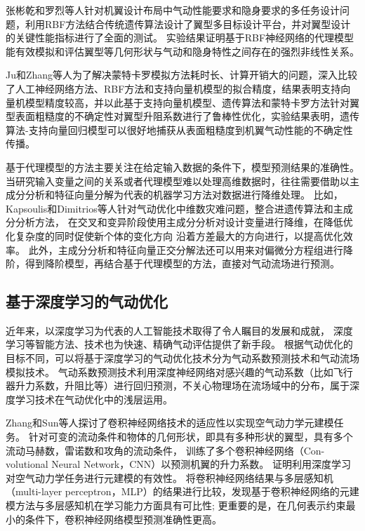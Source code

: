 张彬乾和罗烈等人\cite{张罗}针对机翼设计布局中气动性能要求和隐身要求的多任务设计问题，利用RBF方法结合传统遗传算法设计了翼型多目标设计平台，并对翼型设计的关键性能指标进行了全面的测试。
实验结果证明基于RBF神经网络的代理模型能有效模拟和评估翼型等几何形状与气动和隐身特性之间存在的强烈非线性关系。

Ju和Zhang等人\cite{Ame}为了解决蒙特卡罗模拟方法耗时长、计算开销大的问题，深入比较了人工神经网络方法、RBF方法和支持向量机模型的拟合精度，结果表明支持向量机模型精度较高，并以此基于支持向量机模型、遗传算法和蒙特卡罗方法针对翼型表面粗糙度的不确定性对翼型升阻系数进行了鲁棒性优化，实验结果表明，遗传算法-支持向量回归模型可以很好地捕获从表面粗糙度到机翼气动性能的不确定性传播。

基于代理模型的方法主要关注在给定输入数据的条件下，模型预测结果的准确性。
当研究输入变量之间的关系或者代理模型难以处理高维数据时，往往需要借助以主成分分析和特征向量分解为代表的机器学习方法对数据进行降维处理。
比如，Kapsoulis和Dimitrios等人\cite{Kapsoulis2018Evolutionary}针对气动优化中维数灾难问题，整合进遗传算法和主成分分析方法，
在交叉和变异阶段使用主成分分析对设计变量进行降维，在降低优化复杂度的同时促使新个体的变化方向
沿着方差最大的方向进行，以提高优化效率。
此外，主成分分析和特征向量正交分解法还可以用来对偏微分方程组进行降阶，得到降阶模型，再结合基于代理模型的方法，直接对气动流场进行预测。

\subsection{基于深度学习的气动优化}
近年来，以深度学习为代表的人工智能技术取得了令人瞩目的发展和成就，
深度学习等智能方法、技术也为快速、精确气动评估提供了新手段。
根据气动优化的目标不同，可以将基于深度学习的气动优化技术分为气动系数预测技术和气动流场模拟技术。
气动系数预测技术利用深度神经网络对感兴趣的气动系数（比如飞行器升力系数，升阻比等）进行回归预测，不关心物理场在流场域中的分布，属于深度学习技术在气动优化中的浅层运用。

Zhang和Sun等人\cite{LiftCoefficient}探讨了卷积神经网络技术的适应性以实现空气动力学元建模任务。
针对可变的流动条件和物体的几何形状，即具有多种形状的翼型，具有多个流动马赫数，雷诺数和攻角的流动条件，
训练了多个卷积神经网络（Con-volutional Neural Network，CNN）以预测机翼的升力系数。
证明利用深度学习对空气动力学任务进行元建模的有效性。
将卷积神经网络结果与多层感知机（multi-layer perceptron，MLP）的结果进行比较，发现基于卷积神经网络的元建模方法与多层感知机在学习能力方面具有可比性;
更重要的是，在几何表示约束最小的条件下，卷积神经网络模型预测准确性更高。

